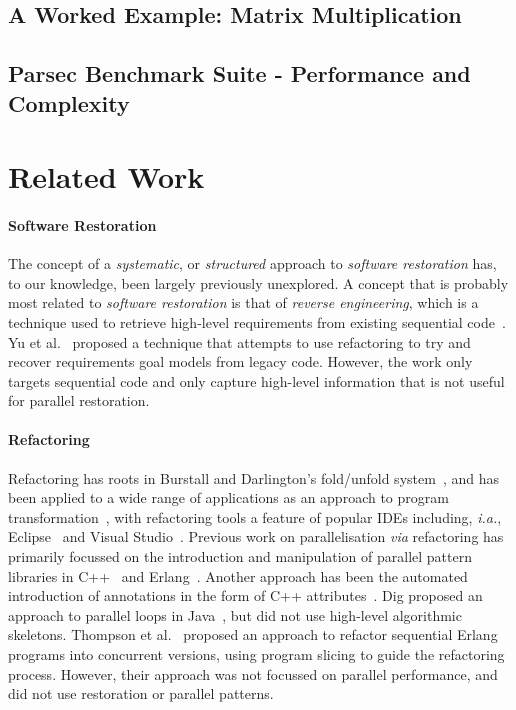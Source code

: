 \subsection{A Worked Example: Matrix Multiplication}

\subsection{Parsec Benchmark Suite - Performance and Complexity}

\section{Related Work}

\paragraph{Software Restoration}

The concept of a \emph{systematic}, or \emph{structured} approach to \emph{software restoration} has, to our knowledge, been largely previously unexplored. A concept that is probably most related to \emph{software restoration} is that of \emph{reverse engineering}, which is a technique used to retrieve high-level requirements from existing sequential code~\cite{10.1145/287000.287001}\cite{10.1145/337180.337234}. Yu et al.~\cite{10.1109/RE.2005.61} proposed a technique that attempts to use refactoring to try and recover requirements goal models from legacy code. However, the work only targets sequential code and only capture high-level information that is not useful for parallel restoration.

\paragraph{Refactoring}
Refactoring has roots in Burstall and Darlington's fold/unfold system~\cite{darlington77}, and has been applied to a wide range of applications as an approach to program transformation~\cite{mens_refactoring}, with refactoring tools a feature of popular IDEs including, \textit{i.a.}, Eclipse~\cite{EclipseWeb} and Visual Studio~\cite{VisualStudioWeb}.
Previous work on parallelisation \textit{via} refactoring has primarily focussed on the introduction and manipulation of parallel pattern libraries in C++~\cite{brownagricultural,DBLP:conf/pdp/JanjicBMHDAG16} and Erlang~\cite{hlpp,DBLP:journals/cai/BarwellBHTB16}. Another approach
has been the automated introduction of annotations in the form of
C++ attributes~\cite{rio:2018}. Dig proposed an approach to parallel loops in Java~\cite{dig}, but did not use high-level algorithmic skeletons. Thompson et al.~\cite{10.1145/2678015.2682533} proposed an approach to refactor sequential Erlang programs into concurrent versions, using program slicing to guide the refactoring process. However, their approach was not focussed on parallel performance, and did not use restoration or parallel patterns.  

